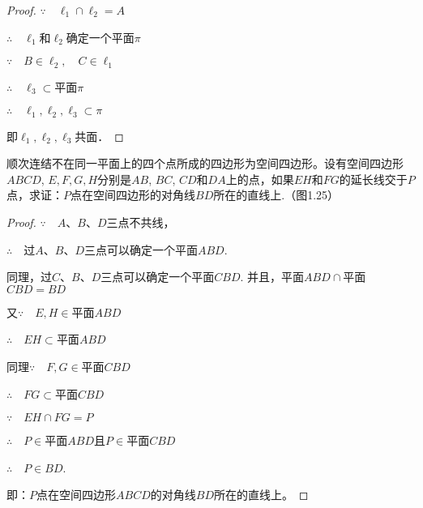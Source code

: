   \begin{proof}
$\because\quad \ell_1\cap\ell_2=A$

$\therefore\quad \ell_1$和$\ell_2$确定一个平面$\pi$

$\because\quad B\in\ell_2,\quad  C\in\ell_1$

$\therefore\quad \ell_3\subset$平面$\pi$

$\therefore\quad \ell_1,\ell_2, \ell_3\subset \pi$

即$\ell_1,\ell_2,\ell_3$共面．
  \end{proof}

\begin{example}
顺次连结不在同一平面上的四个点所成的四边形为空间四边形。设有空间四边形$ABCD$, $E,F,G,H$分别是$AB$, $BC$, $CD$和$DA$上的点，如果$EH$和$FG$的延长线交于$P$点，求证：$P$点在空间四边形的对角线$BD$所在的直线上.（图1.25）
\end{example}

\begin{proof}
$\because\quad A$、$B$、$D$三点不共线，

$\therefore\quad $过$A$、$B$、$D$三点可以确定一个平面$ABD$.

同理，过$C$、$B$、$D$三点可以确定一个平面$CBD$. 并且，平面$ABD\cap $平面$CBD=BD$

又$\because\quad E,H\in$平面$ABD$

$\therefore\quad EH\subset $平面$ABD$

同理$\because\quad F,G\in$平面$CBD$

$\therefore\quad FG\subset $平面$CBD$

$\because\quad EH\cap FG=P$

$\therefore\quad P\in $平面$ABD$且$P\in$平面$CBD$

$\therefore\quad P\in BD$.

即：$P$点在空间四边形$ABCD$的对角线$BD$所在的直线上。
\end{proof}

